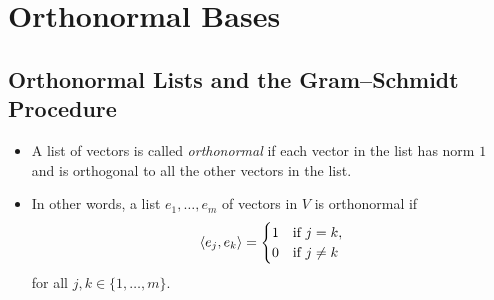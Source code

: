 \iftestbuild %
\setcounter{section}{1}\setcounter{theorem}{21}
\fi %
\section{Orthonormal Bases}

\subsection{Orthonormal Lists and the Gram--Schmidt Procedure}

\begin{definition}[Orthonormal]\label{ax:6.22}\leavevmode
\begin{itemize}
\item A list of vectors is called \emph{orthonormal} if each vector in the list
  has norm $1$ and is orthogonal to all the other vectors in the list.
\item In other words, a list $e_1,\dots,e_m$ of vectors in $V$ is orthonormal if
  \[ \langle e_j, e_k \rangle = \begin{cases} 1 & \text{if } j=k,\\
                                   0 & \text{if } j\ne k \end{cases} \]
  for all $j,k\in\{1,\dots,m\}$.
\end{itemize}
\end{definition}

